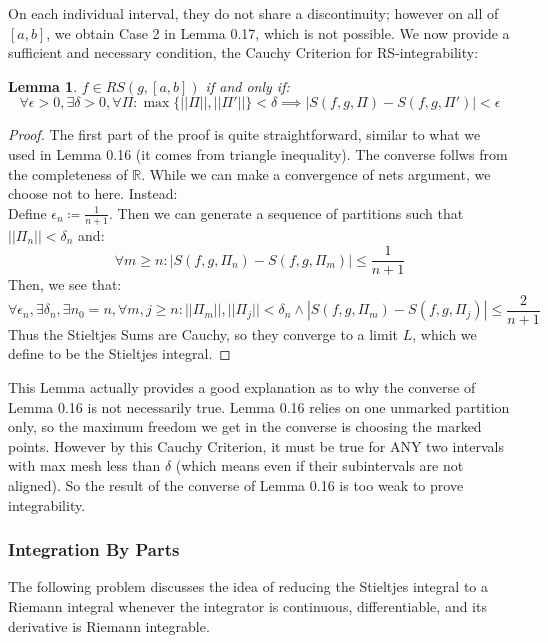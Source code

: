 \documentclass[10pt,letterpaper]{article} %
\newtheorem{lem}{Lemma}[section]
\begin{document}
On each individual interval, they do not share a discontinuity; however on all of $[a, b]$, we obtain Case 2 in Lemma 0.17, which is not possible. We now provide a sufficient and necessary condition, the Cauchy Criterion for RS-integrability:
\begin{lem}
$f \in RS(g, [a, b])$ if and only if:
\begin{equation}
\forall \epsilon > 0, \exists \delta > 0, \forall \Pi: \max\{||\Pi||, ||\Pi'||\} < \delta \implies |S(f, g, \Pi) - S(f, g, \Pi')| < \epsilon
\end{equation}
\end{lem}
\begin{proof}
The first part of the proof is quite straightforward, similar to what we used in Lemma 0.16 (it comes from triangle inequality). The converse follws from the completeness of $\mathbb{R}$. While we can make a convergence of nets argument, we choose not to here. Instead:\\

Define $\epsilon_n \coloneq \frac{1}{n+1}$. Then we can generate a sequence of partitions such that $||\Pi_n|| < \delta_n$ and:
\begin{equation*}
\forall m \geqslant n: |S(f, g, \Pi_n) - S(f, g, \Pi_m)| \leqslant \frac{1}{n+1}
\end{equation*}
Then, we see that:
\begin{equation*}
\forall \epsilon_n, \exists \delta_n, \exists n_0 = n, \forall m, j \geqslant n: ||\Pi_m||, ||\Pi_j|| < \delta_n \land |S(f, g, \Pi_m) - S(f, g, \Pi_j)| \leqslant \frac{2}{n+1} 
\end{equation*}
Thus the Stieltjes Sums are Cauchy, so they converge to a limit $L$, which we define to be the Stieltjes integral.
\end{proof}
This Lemma actually provides a good explanation as to why the converse of Lemma 0.16 is not necessarily true. Lemma 0.16 relies on one unmarked partition only, so the maximum freedom we get in the converse is choosing the marked points. However by this Cauchy Criterion, it must be true for ANY two intervals with max mesh less than $\delta$ (which means even if their subintervals are not aligned). So the result of the converse of Lemma 0.16 is too weak to prove integrability.

\subsubsection{Integration By Parts}
The following problem discusses the idea of reducing the Stieltjes integral to a Riemann integral whenever the integrator is continuous, differentiable, and its derivative is Riemann integrable.\\
\end{document}
